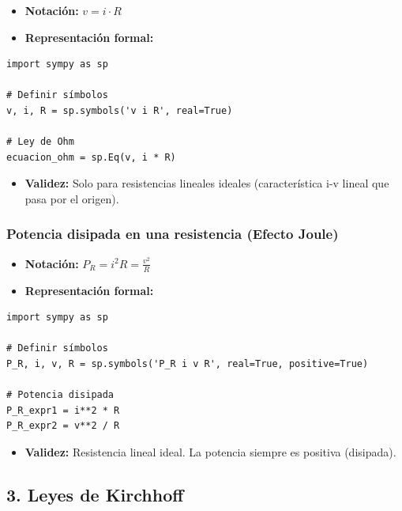 \documentclass[11pt,a4paper]{article}
\begin{document}
\begin{itemize}[leftmargin=*,topsep=2pt,itemsep=1pt]
  \item \textbf{Notación:} $v = i \cdot R$
  \item \textbf{Representación formal:}
\end{itemize}


\begin{lstlisting}
import sympy as sp

# Definir símbolos
v, i, R = sp.symbols('v i R', real=True)

# Ley de Ohm
ecuacion_ohm = sp.Eq(v, i * R)
\end{lstlisting}


\begin{itemize}[leftmargin=*,topsep=2pt,itemsep=1pt]
  \item \textbf{Validez:} Solo para resistencias lineales ideales (característica i-v lineal que pasa por el origen).
\end{itemize}


\subsubsection*{Potencia disipada en una resistencia (Efecto Joule)}


\begin{itemize}[leftmargin=*,topsep=2pt,itemsep=1pt]
  \item \textbf{Notación:} $P_R = i^2 R = \frac{v^2}{R}$
  \item \textbf{Representación formal:}
\end{itemize}


\begin{lstlisting}
import sympy as sp

# Definir símbolos
P_R, i, v, R = sp.symbols('P_R i v R', real=True, positive=True)

# Potencia disipada
P_R_expr1 = i**2 * R
P_R_expr2 = v**2 / R
\end{lstlisting}


\begin{itemize}[leftmargin=*,topsep=2pt,itemsep=1pt]
  \item \textbf{Validez:} Resistencia lineal ideal. La potencia siempre es positiva (disipada).
\end{itemize}


\subsection*{3. Leyes de Kirchhoff}
\end{document}
